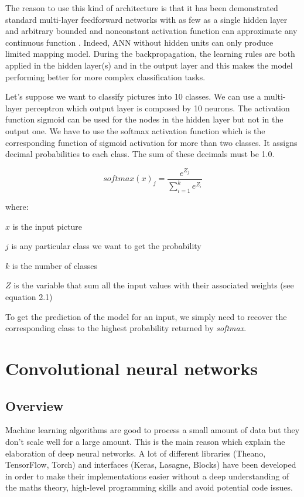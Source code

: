 The reason to use this kind of architecture is that it has been demonstrated standard multi-layer feedforward networks with as few as a single hidden layer and arbitrary bounded and nonconstant activation function can approximate any continuous function \cite{multi}.
Indeed, ANN without hidden units can only produce limited mapping model. During the backpropagation, the learning rules are both applied in the hidden layer(s) and in the output layer and this makes the model performing better for more complex classification tasks.

Let's suppose we want to classify pictures into 10 classes. We can use a multi-layer perceptron which output layer is composed by 10 neurons. The activation function sigmoid can be used for the nodes in the hidden layer but not in the output one. We have to use the softmax activation function which is the corresponding function of sigmoid activation for more than two classes. It assigns decimal probabilities to each class. The sum of these decimals must be 1.0. 

\begin{equation}
{softmax(x)_{j}}=\frac{e^{{Z}_{j}}}{\sum_{i=1}^k e^{Z_{i}} }
\end{equation}

where:

${x}$ is the input picture

${j}$ is any particular class we want to get the probability

${k}$ is the number of classes

${Z}$ is the variable that sum all the input values with their associated weights (see equation 2.1) 

To get the prediction of the model for an input, we simply need to recover the corresponding class to the highest probability returned by \emph{softmax}.

 

\section{Convolutional neural networks}
\subsection{Overview}
Machine learning algorithms are good to process a small amount of data but they don't scale well for a large amount. This is the main reason which explain the elaboration of deep neural networks. A lot of different libraries (Theano, TensorFlow, Torch) and interfaces (Keras, Lasagne, Blocks) have been developed in order to make their implementations easier without a deep understanding of the maths theory, high-level programming skills and avoid potential code issues. 

